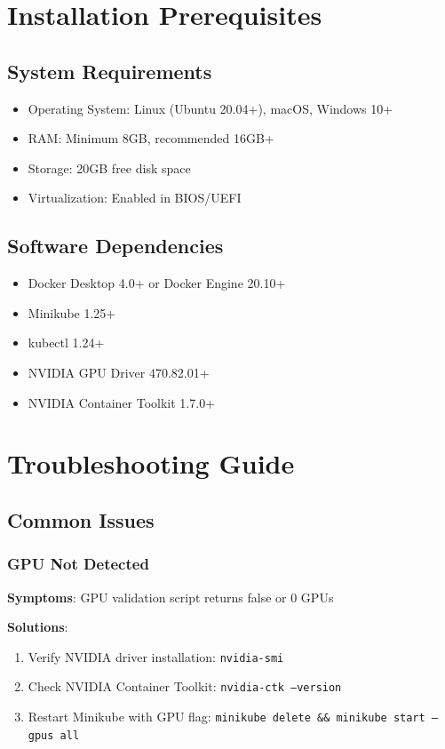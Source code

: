 \documentclass[12pt,a4paper]{report}
\begin{document}
\section{Installation Prerequisites}
\label{sec:prerequisites}

\subsection{System Requirements}
\begin{itemize}
    \item Operating System: Linux (Ubuntu 20.04+), macOS, Windows 10+
    \item RAM: Minimum 8GB, recommended 16GB+
    \item Storage: 20GB free disk space
    \item Virtualization: Enabled in BIOS/UEFI
\end{itemize}

\subsection{Software Dependencies}
\begin{itemize}
    \item Docker Desktop 4.0+ or Docker Engine 20.10+
    \item Minikube 1.25+
    \item kubectl 1.24+
    \item NVIDIA GPU Driver 470.82.01+
    \item NVIDIA Container Toolkit 1.7.0+
\end{itemize}

\section{Troubleshooting Guide}
\label{sec:troubleshooting}

\subsection{Common Issues}

\subsubsection{GPU Not Detected}
\textbf{Symptoms}: GPU validation script returns false or 0 GPUs

\textbf{Solutions}:
\begin{enumerate}
    \item Verify NVIDIA driver installation: \texttt{nvidia-smi}
    \item Check NVIDIA Container Toolkit: \texttt{nvidia-ctk --version}
    \item Restart Minikube with GPU flag: \texttt{minikube delete \&\& minikube start --gpus all}
\end{enumerate}
\end{document}
